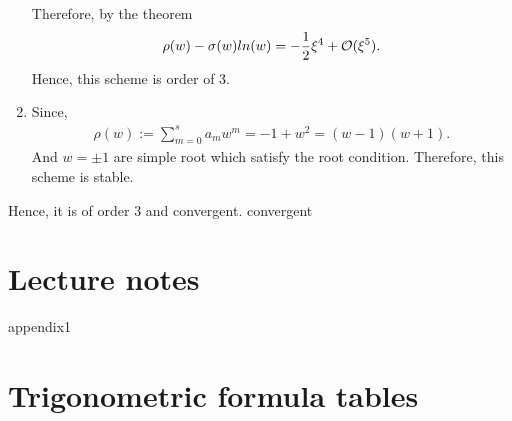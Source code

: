 \documentclass[12pt]  {article}%
\begin{document}
\begin{solution}
\begin{enumerate}
Therefore, by the theorem 
\begin{eqnarray*}
\rho(w)-\sigma(w)ln(w)=-\frac{1}{2}\xi^4+\mathcal{O}{(\xi^5)}.
\end{eqnarray*}
Hence, this scheme is order of 3.
  \item {}
  Since,
   \begin{eqnarray}
\rho(w) :=\sum_{m=0}^{s} a_m w^m=-1+w^2=(w-1)(w+1).
\end{eqnarray}
And $w=\pm 1$ are simple root which satisfy the root condition. Therefore, this scheme is stable. 
\end{enumerate}
Hence, it is of order 3 and convergent.
convergent
\end{solution}


\begin{solution}
\end{solution}



\appendix

\section{Lecture notes}\label{appendix:note1}

appendix1
%
\section{Trigonometric formula tables}
\end{document}

